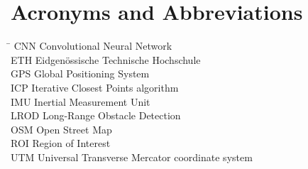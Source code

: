 \section*{Acronyms and Abbreviations}
\begin{tabbing}
 \hspace*{1.6cm}  \= \kill
  CNN \> Convolutional Neural Network \\[0.5ex]
  ETH \> Eidgenössische Technische Hochschule \\[0.5ex]
  GPS \> Global Positioning System \\[0.5ex]
  ICP \> Iterative Closest Points algorithm\\[0.5ex]
  IMU \> Inertial Measurement Unit \\[0.5ex]
  LROD \> Long-Range Obstacle Detection \\[0.5ex]
  OSM \> Open Street Map \\[0.5ex]
  ROI \> Region of Interest \\[0.5ex]
  UTM \> Universal Transverse Mercator coordinate system\\[0.5ex]
\end{tabbing}